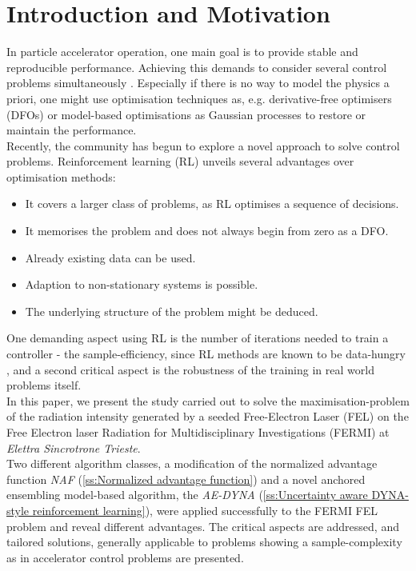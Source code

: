 \documentclass[
reprint,
amsmath,amssymb,amsfonts,clevref,
aps,
prstab,
]{revtex4-2}
\begin{document}
	\section{Introduction and Motivation}
	In particle accelerator operation, one main goal is to provide stable and reproducible performance. Achieving this demands to consider several control problems simultaneously \cite{Kain2020,Scheinker2018}. Especially if there is no way to model the physics a priori, one might use optimisation techniques as, e.g. derivative-free optimisers (DFOs) \cite{Huang2013,Bruchon2017,Scheinker2020,Hirlaender2019,Welsch2015,Albright2019} or model-based optimisations as Gaussian processes \cite{Hanuka2020,Roussel2020} to restore or maintain the performance.\\
	 Recently, the community has begun to explore a novel approach to solve control problems. Reinforcement learning (RL) \cite{Bruchon2020,Bruchon2019,Kain2020,Pang2020} unveils several advantages over optimisation methods:
	\begin{itemize}
		\item It covers a larger class of problems, as RL optimises a sequence of decisions.
		\item It memorises the problem and does not always begin from zero as a DFO.
		\item Already existing data can be used.
		\item Adaption to non-stationary systems is possible.
		\item The underlying structure of the problem might be deduced.
	\end{itemize}
	One demanding aspect using RL is the number of iterations needed to train a controller - the sample-efficiency, since RL methods are known to be data-hungry \cite{Sutton2018,DulacArnold2019}, and a second critical aspect is the robustness of the training in real world problems itself.\\
	In this paper, we present the study carried out to solve the maximisation-problem of the radiation intensity generated by a seeded Free-Electron Laser (FEL) on the Free Electron laser Radiation for Multidisciplinary Investigations (FERMI) at \emph{Elettra Sincrotrone Trieste}.\\
	 Two different algorithm classes, a modification of the normalized advantage function \emph{NAF} (\cref{ss:Normalized advantage function}) and a novel anchored ensembling model-based algorithm, the \emph{AE-DYNA} (\cref{ss:Uncertainty aware DYNA-style reinforcement learning}), were applied successfully to the FERMI FEL problem and reveal different advantages. The critical aspects are addressed, and tailored solutions, generally applicable to problems showing a sample-complexity as in accelerator control problems are presented.
\end{document}
